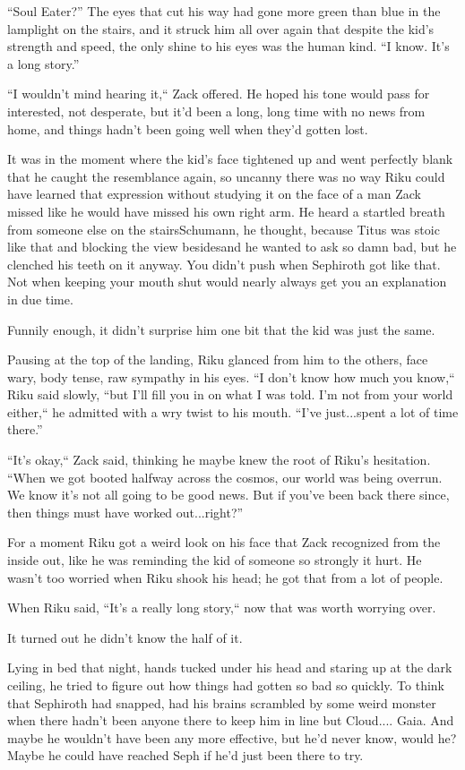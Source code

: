 ``Soul Eater?'' The eyes that cut his way had gone more green than blue in the lamplight on the stairs, and it struck him all over again that despite the kid's strength and speed, the only shine to his eyes was the human kind. ``I know. It's a long story.''

``I wouldn't mind hearing it,`` Zack offered. He hoped his tone would pass for interested, not desperate, but it'd been a long, long time with no news from home, and things hadn't been going well when they'd gotten lost.

It was in the moment where the kid's face tightened up and went perfectly blank that he caught the resemblance again, so uncanny there was no way Riku could have learned that expression without studying it on the face of a man Zack missed like he would have missed his own right arm. He heard a startled breath from someone else on the stairs\textemdash Schumann, he thought, because Titus was stoic like that and blocking the view besides\textemdash and he wanted to ask so damn bad, but he clenched his teeth on it anyway. You didn't push when Sephiroth got like that. Not when keeping your mouth shut would nearly always get you an explanation in due time.

Funnily enough, it didn't surprise him one bit that the kid was just the same.

Pausing at the top of the landing, Riku glanced from him to the others, face wary, body tense, raw sympathy in his eyes. ``I don't know how much you know,`` Riku said slowly, ``but I'll fill you in on what I was told. I'm not from your world either,`` he admitted with a wry twist to his mouth. ``I've just...spent a lot of time there.''

``It's okay,`` Zack said, thinking he maybe knew the root of Riku's hesitation. ``When we got booted halfway across the cosmos, our world was being overrun. We know it's not all going to be good news. But if you've been back there since, then things must have worked out...right?''

For a moment Riku got a weird look on his face that Zack recognized from the inside out, like he was reminding the kid of someone so strongly it hurt. He wasn't too worried when Riku shook his head; he got that from a lot of people.

When Riku said, ``It's a really long story,`` now that was worth worrying over.

It turned out he didn't know the half of it.

Lying in bed that night, hands tucked under his head and staring up at the dark ceiling, he tried to figure out how things had gotten so bad so quickly. To think that Sephiroth had snapped, had his brains scrambled by some weird monster when there hadn't been anyone there to keep him in line but Cloud.... Gaia. And maybe he wouldn't have been any more effective, but he'd never know, would he? Maybe he could have reached Seph if he'd just been there to try.

